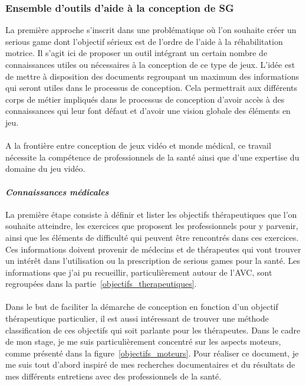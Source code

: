 	\subsubsection{Ensemble d'outils d'aide à la conception de SG} \label{boite_outils}
	La première approche s'inscrit dans une problématique où l'on souhaite créer un serious game dont l'objectif sérieux est de l'ordre de l'aide à la réhabilitation motrice. Il s'agit ici de proposer un outil intégrant un certain nombre de connaissances utiles ou nécessaires à la conception de ce type de jeux. L'idée est de mettre à disposition des documents regroupant un maximum des informations qui seront utiles dans le processus de conception. Cela permettrait aux différents corps de métier impliqués dans le processus de conception d'avoir accès à des connaissances qui leur font défaut et d'avoir une vision globale des éléments en jeu.
	
		\paragraph{}
A la frontière entre conception de jeux vidéo et monde médical, ce travail nécessite la compétence de professionnels de la santé ainsi que d’une expertise du domaine du jeu vidéo.
			\paragraph{\emph{Connaissances médicales}\\}
La première étape consiste à définir et lister les objectifs thérapeutiques que l’on souhaite atteindre, les exercices que proposent les professionnels pour y parvenir, ainsi que les éléments de difficulté qui peuvent être rencontrés dans ces exercices. Ces informations doivent provenir de médecins et de thérapeutes qui vont trouver un intérêt dans l’utilisation ou la prescription de serious games pour la santé. Les informations que j'ai pu recueillir, particulièrement autour de l'AVC, sont regroupées dans la partie~\ref{objectifs_therapeutiques}.

\paragraph{}
Dans le but de faciliter la démarche de conception en fonction d’un objectif thérapeutique particulier, il est aussi intéressant de trouver une méthode classification de ces objectifs qui soit parlante pour les thérapeutes. Dans le cadre de mon stage, je me suis particulièrement concentré sur les aspects moteurs, comme présenté dans la figure~\ref{objectifs_moteurs}. Pour réaliser ce document, je me suis tout d'abord inspiré de mes recherches documentaires et du résultats de mes différents entretiens avec des professionnels de la santé.

